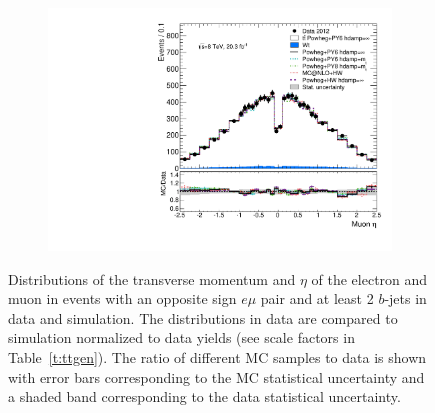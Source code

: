 \begin{figure}[htp]
\begin{subfigure}[]{0.45\textwidth}
\end{subfigure}
\begin{subfigure}[]{0.45\textwidth}
\includegraphics[width=\textwidth]{fig/MCComp/NLO/MuEta.pdf}
\end{subfigure}
\caption{Distributions of the transverse momentum and $\eta$ of the electron and muon in events with an opposite sign $e\mu$ pair and at least 2 $b$-jets in data and simulation. The distributions in data are compared to simulation normalized to data yields (see scale factors in Table~\ref{t:ttgen}). The ratio of different MC samples to data is shown with error bars corresponding to the MC statistical uncertainty and a shaded band corresponding to the data statistical uncertainty.}
\label{fig:emu}
\end{figure}

